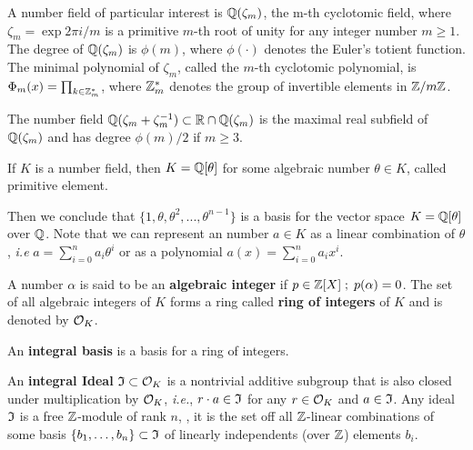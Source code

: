 \documentclass[Ingles]{ic-tese-v3}
\begin{document}
\begin{example}
  A number field of particular interest is $\mathbb{Q}(\zeta_m)$, the m-th cyclotomic field,
  where $\zeta_m = \exp{2\pi i /m}$ is a primitive $m$-th root of unity for any
  integer number $m \geq 1$. The degree of $\mathbb{Q}(\zeta_m)$ is $\phi(m)$, where $\phi(\cdot)$
  denotes the Euler’s totient function. The minimal polynomial of $\zeta_m$, called
  the $m$-th cyclotomic polynomial, is $\Phi_m(x) = \prod_{k \in \mathbb{Z}_{m}^*}$, where $\mathbb{Z}^*_m$ denotes the group of invertible elements in $\mathbb{Z}/m\mathbb{Z}$.
\end{example}

\begin{example}
  \label{ex:maximum-real-subfield}
  The number field $\mathbb{Q}(\zeta_m + \zeta_m^{-1}) \subset \mathbb{R} \cap \mathbb{Q}(\zeta_m)$ is the maximal real subfield of $\mathbb{Q}(\zeta_m)$ and has degree $\phi(m)/2$ if $m \geq 3$.
\end{example}

\begin{theorem}
   If $K$ is a number field, then $K = \mathbb{Q}[\theta]$ for some
  algebraic number $\theta \in K$, called primitive element.
\end{theorem}

Then we conclude that \(\{1, \theta, \theta^2, ... , \theta^{n-1}\}\) is a basis for the vector
space \(K = \mathbb{Q}[\theta]\) over \(\mathbb{Q}\). Note that we can represent an number \(a \in K\) as a linear combination of \(\theta\), \emph{i.e} \(a = \sum^n_{i=0}{a_i\theta^i}\) or as a polynomial \(a(x) = \sum^n_{i=0}{a_ix^i}\).

\begin{definition}
A number $\alpha$ is said to be an \textbf{algebraic integer} if $ p \in \mathbb{Z}[X] \;;\; p(\alpha) = 0$. The set of all algebraic integers of $K$ forms a ring called \textbf{ring of integers} of $K$ and is denoted by $\mathcal{O}_K$.
\end{definition}

\begin{definition}
An \textbf{integral basis} is a basis for a ring of integers. 
\end{definition}

\begin{definition}
  An \textbf{integral Ideal} $\mathfrak{I} \subset \mathcal{O}_K$ is a  nontrivial additive subgroup that
  is also closed under multiplication by $\mathcal{O}_K$, \textit{i.e.}, $r \cdot a \in \mathfrak{I}$ for
  any $r \in \mathcal{O}_K$ and $a \in \mathfrak{I}$. Any ideal $\mathfrak{I}$ is a free $\mathbb{Z}$-module of rank
  $n$, \ie, it is the set off all $\mathbb{Z}$-linear combinations of some basis
  $\{b_1,\dots,b_n\} \subset \mathfrak{I}$  of linearly independents (over $\mathbb{Z}$) elements $b_i$.
\end{definition}
\end{document}
